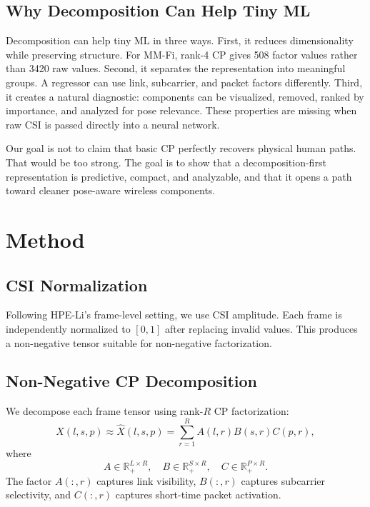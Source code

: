 \documentclass[letterpaper]{article}
\begin{document}
\subsection{Why Decomposition Can Help Tiny ML}

Decomposition can help tiny ML in three ways. First, it reduces dimensionality while preserving structure. For MM-Fi, rank-4 CP gives 508 factor values rather than 3420 raw values. Second, it separates the representation into meaningful groups. A regressor can use link, subcarrier, and packet factors differently. Third, it creates a natural diagnostic: components can be visualized, removed, ranked by importance, and analyzed for pose relevance. These properties are missing when raw CSI is passed directly into a neural network.

Our goal is not to claim that basic CP perfectly recovers physical human paths. That would be too strong. The goal is to show that a decomposition-first representation is predictive, compact, and analyzable, and that it opens a path toward cleaner pose-aware wireless components.

\section{Method}

\subsection{CSI Normalization}

Following HPE-Li's frame-level setting, we use CSI amplitude. Each frame is independently normalized to $[0,1]$ after replacing invalid values. This produces a non-negative tensor suitable for non-negative factorization.

\subsection{Non-Negative CP Decomposition}

We decompose each frame tensor using rank-$R$ CP factorization:
\begin{equation}
    X(l,s,p)
    \approx
    \hat{X}(l,s,p)
    =
    \sum_{r=1}^{R}
    A(l,r)B(s,r)C(p,r),
    \label{eq:cp}
\end{equation}
where
\begin{equation}
    A \in \mathbb{R}_{+}^{L \times R}, \quad
    B \in \mathbb{R}_{+}^{S \times R}, \quad
    C \in \mathbb{R}_{+}^{P \times R}.
\end{equation}
The factor $A(:,r)$ captures link visibility, $B(:,r)$ captures subcarrier selectivity, and $C(:,r)$ captures short-time packet activation.
\end{document}
